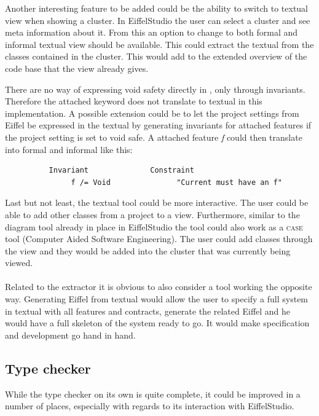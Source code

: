 Another interesting feature to be added could be the ability to switch to textual \bon{} view when showing a cluster. In EiffelStudio the user can select a cluster and see meta information about it. From this an option to change to both formal and informal textual \bon{} view should be available. This could extract the textual \bon{} from the classes contained in the cluster. This would add to the extended overview of the code base that the \bon{} view already gives.

There are no way of expressing void safety directly in \bon, only through invariants. Therefore the attached keyword does not translate to textual \bon{} in this implementation. A possible extension could be to let the project settings from Eiffel be expressed in the textual \bon{} by generating invariants for attached features if the project setting is set to void safe. A attached feature \textit{f} could then translate into formal and informal \bon{} like this:
\footnotesize
\begin{verbatim}
          Invariant              Constraint
               f /= Void               "Current must have an f"
\end{verbatim}

\normalsize Last but not least, the textual \bon{} tool could be more interactive. The user could be able to add other classes from a project to a \bon{} view. Furthermore, similar to the diagram tool already in place in EiffelStudio the \bon{} tool could also work as a \textsc{case} tool (Computer Aided Software Engineering). The user could add classes through the \bon{} view and they would be added into the cluster that was currently being viewed.

\paragraph{}
Related to the \bon{} extractor it is obvious to also consider a tool working the opposite way. Generating Eiffel from textual \bon{} would allow the user to specify a full system in textual \bon{} with all features and contracts, generate the related Eiffel and he would have a full skeleton of the system ready to go. It would make specification and development go hand in hand.

\subsection{Type checker}
While the type checker on its own is quite complete, it could be improved in a number of places, especially with regards to its interaction with EiffelStudio.

